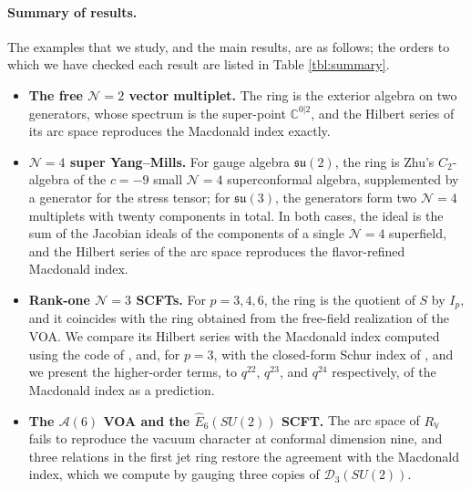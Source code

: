 \documentclass[12pt]{article}
\numberwithin{equation}{section}
\numberwithin{figure}{section}
\theoremstyle{plain}
\theoremstyle{definition}
\begin{document}
\paragraph{Summary of results.} The examples that we study, and the main results, are as follows; the orders to which we have checked each result are listed in Table \ref{tbl:summary}.
\begin{itemize}
    \item \textbf{The free $\mathcal{N}=2$ vector multiplet.} The ring is the exterior algebra on two generators, whose spectrum is the super-point $\mathbb{C}^{0|2}$, and the Hilbert series of its arc space reproduces the Macdonald index exactly.
    \item \textbf{$\mathcal{N}=4$ super Yang--Mills.} For gauge algebra $\mathfrak{su}(2)$, the ring is Zhu's $C_2$-algebra of the $c=-9$ small $\mathcal{N}=4$ superconformal algebra, supplemented by a generator for the stress tensor; for $\mathfrak{su}(3)$, the generators form two $\mathcal{N}=4$ multiplets with twenty components in total. In both cases, the ideal is the sum of the Jacobian ideals of the components of a single $\mathcal{N}=4$ superfield, and the Hilbert series of the arc space reproduces the flavor-refined Macdonald index.
    \item \textbf{Rank-one $\mathcal{N}=3$ SCFTs.} For $p = 3, 4, 6$, the ring is the quotient of $S$ by $I_p$, and it coincides with the ring obtained from the free-field realization of the VOA. We compare its Hilbert series with the Macdonald index computed using the code of \cite{Agarwal:2021oyl}, and, for $p = 3$, with the closed-form Schur index of \cite{Guo:2026lsl}, and we present the higher-order terms, to $q^{22}$, $q^{23}$, and $q^{24}$ respectively, of the Macdonald index as a prediction.
    \item \textbf{The $\mathcal{A}(6)$ VOA and the $\widehat{E}_6(SU(2))$ SCFT.} The arc space of $R_\mathbb{V}$ fails to reproduce the vacuum character at conformal dimension nine, and three relations in the first jet ring restore the agreement with the Macdonald index, which we compute by gauging three copies of $\mathcal{D}_3(SU(2))$.
\end{itemize}
\end{document}
